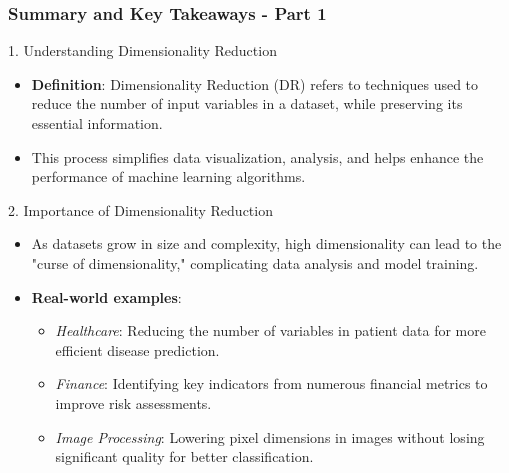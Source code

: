 \documentclass[aspectratio=169]{beamer}
\begin{document}
\begin{frame}[fragile]
    \frametitle{Summary and Key Takeaways - Part 1}
    \begin{block}{1. Understanding Dimensionality Reduction}
        \begin{itemize}
            \item \textbf{Definition}: Dimensionality Reduction (DR) refers to techniques used to reduce the number of input variables in a dataset, while preserving its essential information.
            \item This process simplifies data visualization, analysis, and helps enhance the performance of machine learning algorithms.
        \end{itemize}
    \end{block}

    \begin{block}{2. Importance of Dimensionality Reduction}
        \begin{itemize}
            \item As datasets grow in size and complexity, high dimensionality can lead to the "curse of dimensionality," complicating data analysis and model training.
            \item \textbf{Real-world examples}:
                \begin{itemize}
                    \item \textit{Healthcare}: Reducing the number of variables in patient data for more efficient disease prediction.
                    \item \textit{Finance}: Identifying key indicators from numerous financial metrics to improve risk assessments.
                    \item \textit{Image Processing}: Lowering pixel dimensions in images without losing significant quality for better classification.
                \end{itemize}
        \end{itemize}
    \end{block}

\end{frame}
\end{document}
